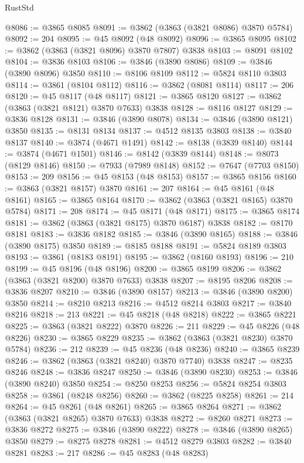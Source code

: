 \begin{lexlean}{RustStd}
\begin{coremodule}
@8086 := @3865 @8085
@8091 := @3862 (@3863 (@3821 @8086) @3870 @5784)
@8092 := 204
@8095 := @45 @8092 (@48 @8092)
@8096 := @3865 @8095
@8102 := @3862 (@3863 (@3821 @8096) @3870 @7807) @3838
@8103 := @8091 @8102
@8104 := @3836 @8103
@8106 := @3846 (@3890 @8086)
@8109 := @3846 (@3890 @8096) @3850
@8110 := @8106 @8109
@8112 := @5824 @8110 @3803
@8114 := @3861 (@8104 @8112)
@8116 := @3862 (@8081 @8114)
@8117 := 206
@8120 := @45 @8117 (@48 @8117)
@8121 := @3865 @8120
@8127 := @3862 (@3863 (@3821 @8121) @3870 @7633) @3838
@8128 := @8116 @8127
@8129 := @3836 @8128
@8131 := @3846 (@3890 @8078)
@8134 := @3846 (@3890 @8121) @3850
@8135 := @8131 @8134
@8137 := @4512 @8135 @3803
@8138 := @3840 @8137
@8140 := @3874 (@4671 @1491)
@8142 := @8138 (@3839 @8140)
@8144 := @3874 (@4671 @1501)
@8146 := @8142 (@3839 @8144)
@8148 := @8073 (@8129 @8146)
@8150 := @7933 (@7989 @8148)
@8152 := @7647 (@7703 @8150)
@8153 := 209
@8156 := @45 @8153 (@48 @8153)
@8157 := @3865 @8156
@8160 := @3863 (@3821 @8157) @3870
@8161 := 207
@8164 := @45 @8161 (@48 @8161)
@8165 := @3865 @8164
@8170 := @3862 (@3863 (@3821 @8165) @3870 @5784)
@8171 := 208
@8174 := @45 @8171 (@48 @8171)
@8175 := @3865 @8174
@8181 := @3862 (@3863 (@3821 @8175) @3870 @6187) @3838
@8182 := @8170 @8181
@8183 := @3836 @8182
@8185 := @3846 (@3890 @8165)
@8188 := @3846 (@3890 @8175) @3850
@8189 := @8185 @8188
@8191 := @5824 @8189 @3803
@8193 := @3861 (@8183 @8191)
@8195 := @3862 (@8160 @8193)
@8196 := 210
@8199 := @45 @8196 (@48 @8196)
@8200 := @3865 @8199
@8206 := @3862 (@3863 (@3821 @8200) @3870 @7633) @3838
@8207 := @8195 @8206
@8208 := @3836 @8207
@8210 := @3846 (@3890 @8157)
@8213 := @3846 (@3890 @8200) @3850
@8214 := @8210 @8213
@8216 := @4512 @8214 @3803
@8217 := @3840 @8216
@8218 := 213
@8221 := @45 @8218 (@48 @8218)
@8222 := @3865 @8221
@8225 := @3863 (@3821 @8222) @3870
@8226 := 211
@8229 := @45 @8226 (@48 @8226)
@8230 := @3865 @8229
@8235 := @3862 (@3863 (@3821 @8230) @3870 @5784)
@8236 := 212
@8239 := @45 @8236 (@48 @8236)
@8240 := @3865 @8239
@8246 := @3862 (@3863 (@3821 @8240) @3870 @7740) @3838
@8247 := @8235 @8246
@8248 := @3836 @8247
@8250 := @3846 (@3890 @8230)
@8253 := @3846 (@3890 @8240) @3850
@8254 := @8250 @8253
@8256 := @5824 @8254 @3803
@8258 := @3861 (@8248 @8256)
@8260 := @3862 (@8225 @8258)
@8261 := 214
@8264 := @45 @8261 (@48 @8261)
@8265 := @3865 @8264
@8271 := @3862 (@3863 (@3821 @8265) @3870 @7633) @3838
@8272 := @8260 @8271
@8273 := @3836 @8272
@8275 := @3846 (@3890 @8222)
@8278 := @3846 (@3890 @8265) @3850
@8279 := @8275 @8278
@8281 := @4512 @8279 @3803
@8282 := @3840 @8281
@8283 := 217
@8286 := @45 @8283 (@48 @8283)

\end{coremodule}
\end{lexlean}
